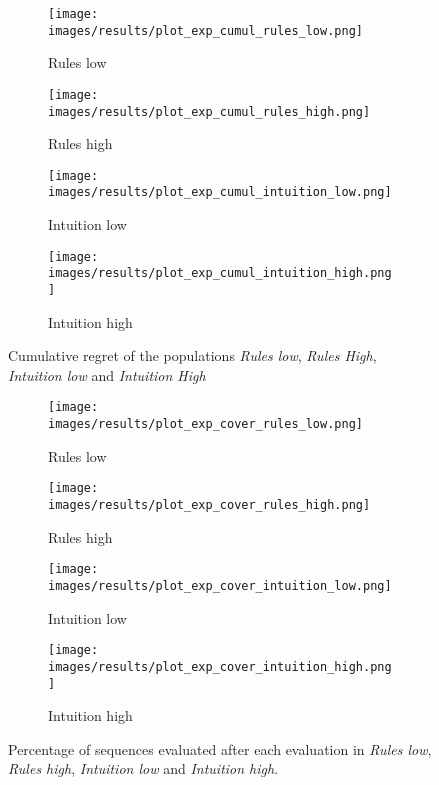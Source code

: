 \begin{figure}[ht]
	\begin{subfigure}{0.49\linewidth}
	\centering
	\texttt{[image: images/results/plot\_exp\_cumul\_rules\_low.png]}
	\caption{Rules low}
	\label{fig:exp_cumul_rules_low}
	\end{subfigure}
	\hfill
	\begin{subfigure}{0.49\linewidth}
	\centering
	\texttt{[image: images/results/plot\_exp\_cumul\_rules\_high.png]}
	\caption{Rules high}
	\label{fig:exp_cumul_rules_high}
	\end{subfigure}
	\begin{subfigure}{0.49\linewidth}
	\centering
	\texttt{[image: images/results/plot\_exp\_cumul\_intuition\_low.png]}
	\caption{Intuition low}
	\label{fig:exp_cumul_intuition_low}
	\end{subfigure}
	\hfill
	\begin{subfigure}{0.49\linewidth}
	\centering
	\texttt{[image: images/results/plot\_exp\_cumul\_intuition\_high.png]}
	\caption{Intuition high}
	\label{fig:exp_cumul_intuition_high}
	\end{subfigure}
	\caption{Cumulative regret of the populations \emph{Rules low}, \emph{Rules
	High}, \emph{Intuition low} and \emph{Intuition High}}
	\label{fig:exp_cumul1}
\end{figure}

\begin{figure}[ht]
	\begin{subfigure}{0.49\linewidth}
	\centering
	\texttt{[image: images/results/plot\_exp\_cover\_rules\_low.png]}
	\caption{Rules low}
	\label{fig:exp_cover_rules_low}
	\end{subfigure}
	\hfill
	\begin{subfigure}{0.49\linewidth}
	\centering
	\texttt{[image: images/results/plot\_exp\_cover\_rules\_high.png]}
	\caption{Rules high}
	\label{fig:exp_cover_rules_high}
	\end{subfigure}
	\begin{subfigure}{0.49\linewidth}
	\centering
	\texttt{[image: images/results/plot\_exp\_cover\_intuition\_low.png]}
	\caption{Intuition low}
	\label{fig:exp_cover_intuition_low}
	\end{subfigure}
	\hfill
	\begin{subfigure}{0.49\linewidth}
	\centering
	\texttt{[image: images/results/plot\_exp\_cover\_intuition\_high.png]}
	\caption{Intuition high}
	\label{fig:exp_cover_intuition_high}
	\end{subfigure}
	\caption{Percentage of sequences evaluated after each evaluation in \emph{Rules
	low}, \emph{Rules high}, \emph{Intuition low} and \emph{Intuition high}.}
	\label{fig:exp_cover1}
\end{figure}

